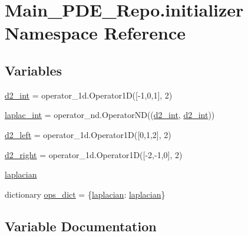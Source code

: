 \hypertarget{namespaceMain__PDE__Repo_1_1initializer}{}\section{Main\+\_\+\+P\+D\+E\+\_\+\+Repo.\+initializer Namespace Reference}
\label{namespaceMain__PDE__Repo_1_1initializer}
\subsection*{Variables}
\begin{DoxyCompactItemize}
\item 
\hyperlink{namespaceMain__PDE__Repo_1_1initializer_a657e8b73e6463b4e45e67b4854e3bdcc}{d2\+\_\+int} = operator\+\_\+1d.\+Operator1D(\mbox{[}-\/1,0,1\mbox{]}, 2)
\item 
\hyperlink{namespaceMain__PDE__Repo_1_1initializer_a588f8a108166ccbf39c9e31dd69a1a7c}{laplac\+\_\+int} = operator\+\_\+nd.\+Operator\+ND((\hyperlink{namespaceMain__PDE__Repo_1_1initializer_a657e8b73e6463b4e45e67b4854e3bdcc}{d2\+\_\+int}, \hyperlink{namespaceMain__PDE__Repo_1_1initializer_a657e8b73e6463b4e45e67b4854e3bdcc}{d2\+\_\+int}))
\item 
\hyperlink{namespaceMain__PDE__Repo_1_1initializer_a24c8c2b7c649edf215c2573852cd73fc}{d2\+\_\+left} = operator\+\_\+1d.\+Operator1D(\mbox{[}0,1,2\mbox{]}, 2)
\item 
\hyperlink{namespaceMain__PDE__Repo_1_1initializer_afd3adfb33fdba510d2b75e2cd9e01e42}{d2\+\_\+right} = operator\+\_\+1d.\+Operator1D(\mbox{[}-\/2,-\/1,0\mbox{]}, 2)
\item 
\hyperlink{namespaceMain__PDE__Repo_1_1initializer_a5d29fae6a76c81157540503a6d4340a0}{laplacian}
\item 
dictionary \hyperlink{namespaceMain__PDE__Repo_1_1initializer_aa5c3b3b00275767f3e2e1c8eca05c3e3}{ops\+\_\+dict} = \{\textquotesingle{}\hyperlink{namespaceMain__PDE__Repo_1_1initializer_a5d29fae6a76c81157540503a6d4340a0}{laplacian}\textquotesingle{}\+: \hyperlink{namespaceMain__PDE__Repo_1_1initializer_a5d29fae6a76c81157540503a6d4340a0}{laplacian}\}
\end{DoxyCompactItemize}


\subsection{Variable Documentation}
\mbox{\label{namespaceMain__PDE__Repo_1_1initializer_a657e8b73e6463b4e45e67b4854e3bdcc}} 
